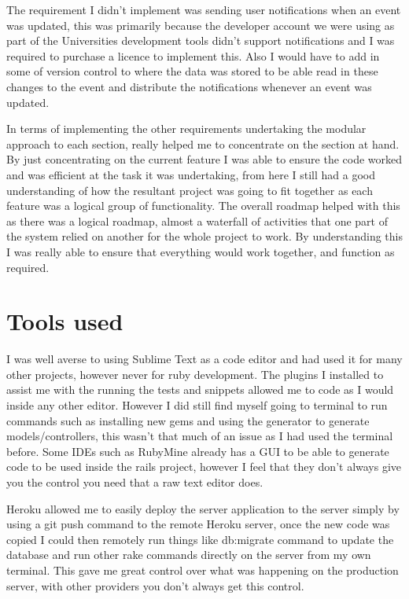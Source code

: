 	The requirement I didn't implement was sending user notifications when an event was updated, this was primarily because the developer account we were using as part of the Universities development tools didn't support notifications and I was required to purchase a licence to implement this. Also I would have to add in some of version control to where the data was stored to be able read in these changes to the event and distribute the notifications whenever an event was updated. 

	In terms of implementing the other requirements undertaking the modular approach to each section, really helped me to concentrate on the section at hand. By just concentrating on the current feature I was able to ensure the code worked and was efficient at the task it was undertaking, from here I still had a good understanding of how the resultant project was going to fit together as each feature was a logical group of functionality. The overall roadmap helped with this as there was a logical roadmap, almost a waterfall of activities that one part of the system relied on another for the whole project to work. By understanding this I was really able to ensure that everything would work together, and function as required. 

\section{Tools used}
	I was well averse to using Sublime Text  as a code editor and had used it for many other projects, however never for ruby development. The plugins I installed to assist me with the running the tests and snippets allowed me to code as I would inside any other editor. However I did still find myself going to terminal to run commands such as installing new gems and using the generator to generate models/controllers, this wasn't that much of an issue as I had used the terminal before. Some IDEs such as RubyMine already has a GUI to be able to generate code to be used inside the rails project, however I feel that they don't always give you the control you need that a raw text editor does. 

	Heroku allowed me to easily deploy the server application to the server simply by using a git push command to the remote Heroku server, once the new code was copied I could then remotely run things like db:migrate command to update the database and run other rake commands directly on the server from my own terminal. This gave me great control over what was happening on the production server, with other providers you don't always get this control. 

